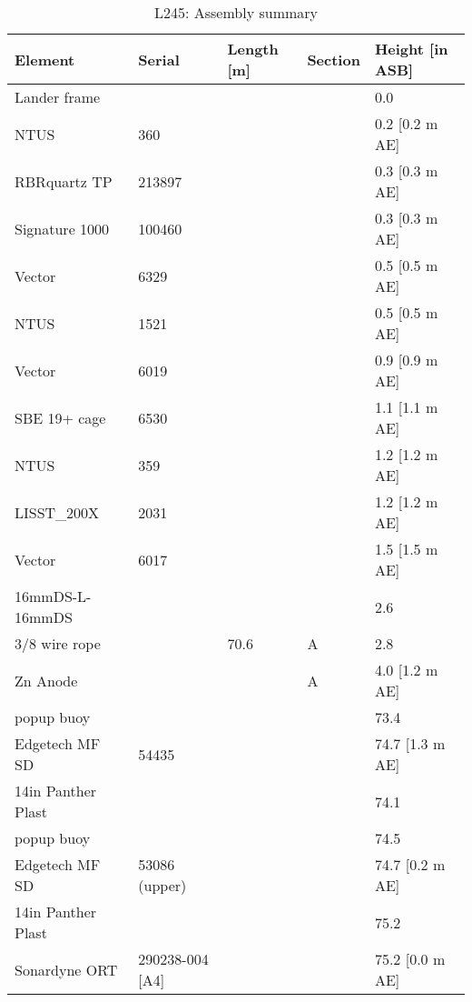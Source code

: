 \documentclass{article}
\begin{document}
\begin{table}[!htbp]
\centering
\caption{L245: Assembly summary}
\begin{tabular}{lllll}
\toprule
Element & Serial & Length [m] & Section & Height [in ASB] \\
\midrule
Lander frame &  &  &  & 0.0 \\
NTUS & 360 &  &  & 0.2 [0.2 m AE] \\
RBRquartz TP & 213897 &  &  & 0.3 [0.3 m AE] \\
Signature 1000 & 100460 &  &  & 0.3 [0.3 m AE] \\
Vector & 6329 &  &  & 0.5 [0.5 m AE] \\
NTUS & 1521 &  &  & 0.5 [0.5 m AE] \\
Vector & 6019 &  &  & 0.9 [0.9 m AE] \\
SBE 19+ cage & 6530 &  &  & 1.1 [1.1 m AE] \\
NTUS & 359 &  &  & 1.2 [1.2 m AE] \\
LISST\_200X & 2031 &  &  & 1.2 [1.2 m AE] \\
Vector & 6017 &  &  & 1.5 [1.5 m AE] \\
16mmDS-L-16mmDS &  &  &  & 2.6 \\
3/8 wire rope &  & 70.6 & A & 2.8 \\
Zn Anode &  &  & A & 4.0 [1.2 m AE] \\
popup buoy &  &  &  & 73.4 \\
Edgetech MF SD & 54435 &  &  & 74.7 [1.3 m AE] \\
14in Panther Plast &  &  &  & 74.1 \\
popup buoy &  &  &  & 74.5 \\
Edgetech MF SD & 53086 (upper) &  &  & 74.7 [0.2 m AE] \\
14in Panther Plast &  &  &  & 75.2 \\
Sonardyne ORT & 290238-004 [A4] &  &  & 75.2 [0.0 m AE] \\
\bottomrule
\end{tabular}
\end{table}
\end{document}
